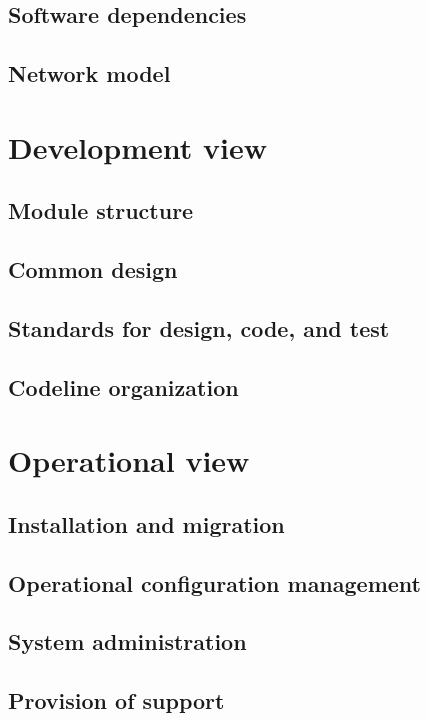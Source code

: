 \subsection{Software dependencies}
\label{sec:softw-depend}


\subsection{Network model}
\label{sec:network-model}


\section{Development view}
\label{sec:development-view}


\subsection{Module structure}
\label{sec:module-structure}


\subsection{Common design}
\label{sec:common-design}


\subsection{Standards for design, code, and test}
\label{sec:stand-design-code}


\subsection{Codeline organization}
\label{sec:codel-organ}


\section{Operational view}
\label{sec:operational-view}

\subsection{Installation and migration}
\label{sec:inst-migr}


\subsection{Operational configuration management}
\label{sec:oper-conf-manag}


\subsection{System administration}
\label{sec:syst-admin}


\subsection{Provision of support}
\label{sec:provision-support}



